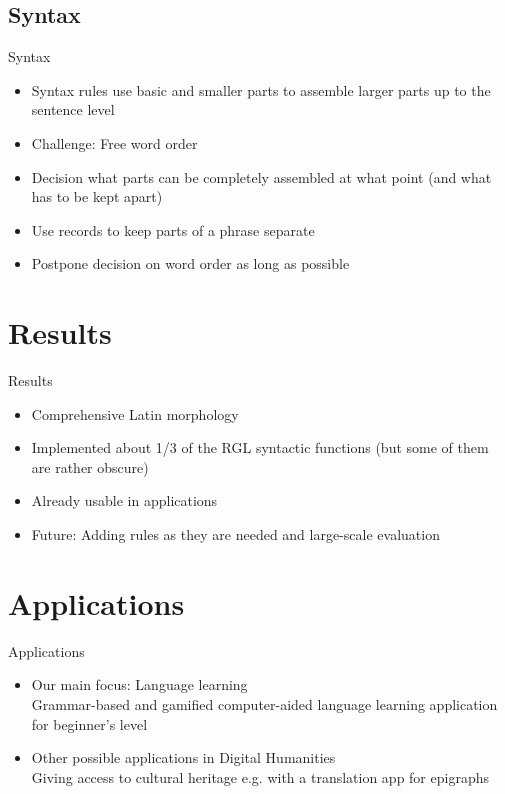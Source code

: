 \documentclass[compress,table]{beamer} %
\begin{document}
\subsection{Syntax}
\begin{frame}{Syntax}
  \begin{itemize}
  \item Syntax rules use basic and smaller parts to assemble larger parts up to the sentence level
  \item Challenge: Free word order
  \item Decision what parts can be completely assembled at what point (and what has to be kept apart)
  \item Use records to keep parts of a phrase separate
  \item Postpone decision on word order as long as possible
  \end{itemize}
\end{frame}

\section{Results}

\begin{frame}{Results}
  \begin{itemize}
  \item Comprehensive Latin morphology
  \item Implemented about 1/3 of the RGL syntactic functions (but some of them are rather obscure)
  \item Already usable in applications
  \item Future: Adding rules as they are needed and large-scale evaluation
  \end{itemize}
\end{frame}
\section{Applications}

\begin{frame}{Applications}
  \begin{itemize}
  \item Our main focus: Language learning\\
    Grammar-based and gamified computer-aided language learning application for beginner's level
  \item Other possible applications in Digital Humanities\\
    Giving access to cultural heritage e.g. with a translation app for epigraphs
  \end{itemize}
\end{frame}
\end{document}
